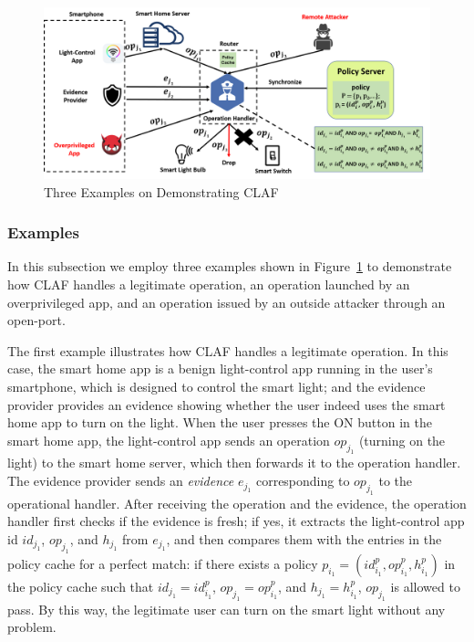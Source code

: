 \documentclass[letterpaper,12pt]{article}
\begin{document}
\begin{figure}[!htb]
        \centering
        \includegraphics[scale=0.25]{examples.png}
        \caption{Three Examples on Demonstrating CLAF}
        \label{fig:examples}
\end{figure}

\subsubsection{Examples} \label{sec:examples}

In this subsection we employ three examples shown in Figure~\ref{fig:examples} to demonstrate how CLAF handles a legitimate operation, an operation launched by an overprivileged app, and an operation issued by an outside attacker through an open-port. 

The first example illustrates how CLAF handles a legitimate operation. In this case, the smart home app is a benign light-control app running in the user's smartphone, which is designed to control the smart light; and the evidence provider provides an evidence showing whether the user indeed uses the smart home app to turn on the light. When the user presses the ON button in the smart home app, the light-control app sends an operation $op_{j_1}$ (turning on the light) to the smart home server, which then forwards it to the operation handler. The evidence provider sends an \textit{evidence} $e_{j_1}$ corresponding to $op_{j_1}$ to the operational handler. After receiving the operation and the evidence, the operation handler first checks if the evidence is fresh; if yes, it extracts the light-control app id $id_{j_1}$, $op_{j_1}$, and $h_{j_1}$ from  $e_{j_1}$, and then compares them with the entries in the policy cache for a perfect match: if there exists a policy $p_{i_1}=(id^{p}_{i_1}, op^{p}_{i_1}, h^{p}_{i_1})$ in the policy cache such that $id_{j_1}=id^{p}_{i_1}$,  $op_{j_1}=op^{p}_{i_1}$, and $h_{j_1}=h^{p}_{i_1}$, $op_{j_1}$ is allowed to pass. By this way, the legitimate user can turn on the smart light without any problem.
\end{document}
